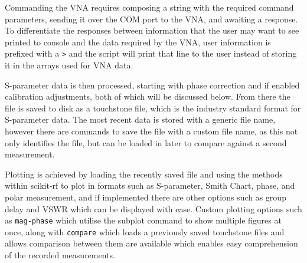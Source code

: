 Commanding the VNA requires composing a string with the required command parameters, sending it over the COM port to the VNA, and awaiting a response. To differentiate the responses between information that the user may want to see printed to console and the data required by the VNA, user information is prefixed with a \texttt{>} and the script will print that line to the user instead of storing it in the arrays used for VNA data. 

S-parameter data is then processed, starting with phase correction and if enabled calibration adjustments, both of which will be discussed below. From there the file is saved to disk as a touchstone file, which is the industry standard format for S-parameter data. The most recent data is stored with a generic file name, however there are commands to save the file with a custom file name, as this not only identifies the file, but can be loaded in later to compare against a second measurement. 

Plotting is achieved by loading the recently saved file and using the methods within scikit-rf to plot in formats such as S-parameter, Smith Chart, phase, and polar measurement, and if implemented there are other options such as group delay and VSWR which can be displayed with ease. Custom plotting options such as \texttt{mag-phase} which utilise the subplot command to show multiple figures at once, along with \texttt{compare} which loads a previously saved touchstone files and allows comparison between them are available which enables easy comprehension of the recorded measurements.  

